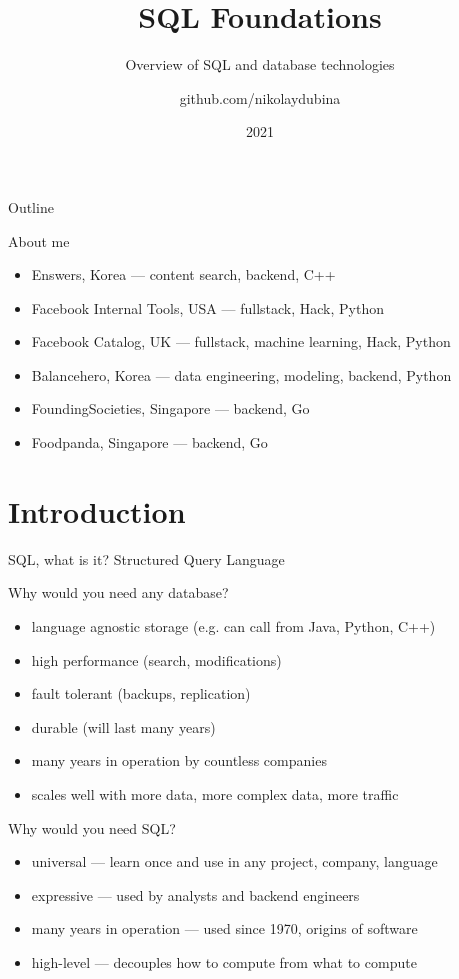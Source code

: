 \documentclass[t,pdf]{beamer}
\title[SQL Foundations]{SQL Foundations}
\subtitle{Overview of SQL and database technologies}
\author{github.com/nikolaydubina}
\date{2021}
\begin{document}
\begin{frame}
  \titlepage
\end{frame}

\begin{frame}{Outline}
  \tableofcontents
\end{frame}

\begin{frame}{About me}

\begin{itemize}
    \item Enswers, Korea — content search, backend, C++
    \item Facebook Internal Tools, USA — fullstack, Hack, Python
    \item Facebook Catalog, UK — fullstack, machine learning, Hack, Python
    \item Balancehero, Korea — data engineering, modeling, backend, Python
    \item FoundingSocieties, Singapore — backend, Go
    \item Foodpanda, Singapore — backend, Go
\end{itemize}

\end{frame}

\section{Introduction}

\begin{frame}{SQL, what is it?}
Structured Query Language
\end{frame}

\begin{frame}{Why would you need any database?}
\begin{itemize}
    \item language agnostic storage (e.g. can call from Java, Python, C++)
    \item high performance (search, modifications)
    \item fault tolerant (backups, replication)
    \item durable (will last many years)
    \item many years in operation by countless companies
    \item scales well with more data, more complex data, more traffic
\end{itemize}
\end{frame}

\begin{frame}{Why would you need SQL?}
\begin{itemize}
    \item universal — learn once and use in any project, company, language
    \item expressive — used by analysts and backend engineers
    \item many years in operation — used since 1970, origins of software
    \item high-level — decouples how to compute from what to compute
\end{itemize}
\end{frame}
\end{document}
